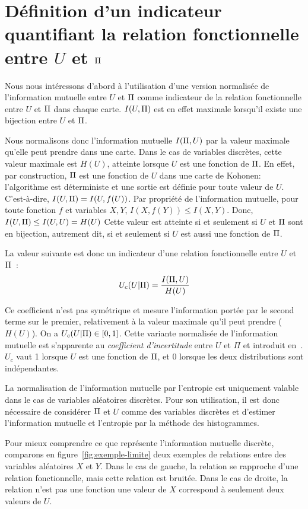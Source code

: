 \documentclass[../main]{subfiles}
\begin{document}
\section{Définition d'un indicateur quantifiant la relation fonctionnelle entre $U$ et $\Pi$}

Nous nous intéressons d'abord à l'utilisation d'une version normalisée de l'information mutuelle entre $U$ et $\Pi$ comme indicateur de la relation fonctionnelle entre $U$ et $\Pi$ dans chaque carte.
$I(U,\Pi)$ est en effet maximale lorsqu'il existe une bijection entre $U$ et $\Pi$.

Nous normalisons donc l'information mutuelle $I(\Pi,U)$  par la valeur maximale qu'elle peut prendre dans une carte. 
Dans le cas de variables discrètes, cette valeur maximale est $H(U)$, atteinte lorsque $U$ est une fonction de $\Pi$.
En effet, par construction, $\Pi$ est une fonction de $U$ dans une carte de Kohonen: l'algorithme est déterministe et une sortie est définie pour toute valeur de $U$. C'est-à-dire, $I(U,\Pi) = I (U, f(U))$.
Par propriété de l'information mutuelle, pour toute fonction $f$ et variables $X,Y$, $I(X,f(Y)) \leq I(X,Y) $. 
Donc, $I(U,\Pi) \leq I(U,U) = H(U)$
Cette valeur est atteinte si et seulement si $U$ et $\Pi$ sont en bijection, autrement dit, si et seulement si $U$ est aussi une fonction de $\Pi$.

La valeur suivante est donc un indicateur d'une relation fonctionnelle entre $U$ et $\Pi$~:
\begin{equation}
U_c(U|\Pi) = \frac{I(\Pi,U)}{H(U)}
\end{equation}

Ce coefficient n'est pas symétrique et mesure l'information portée par le second terme sur le premier, relativement à la valeur maximale qu'il peut prendre ($H(U)$). 
On a $U_c(U|\Pi) \in [0,1]$. 
Cette variante normalisée de l'information mutuelle est s'apparente au \emph{coefficient d'incertitude} entre $U$ et $\Pi$ et introduit en~\cite{Theil1961EconomicFA}.
$U_c$ vaut 1 lorsque $U$ est une fonction de $\Pi$, et $0$ lorsque les deux distributions sont indépendantes.

La normalisation de l'information mutuelle par l'entropie est uniquement valable dans le cas de variables aléatoires discrètes. Pour son utilisation, il est donc nécessaire de considérer $\Pi$ et $U$ comme des variables discrètes et d'estimer l'information mutuelle et l'entropie par la méthode des histogrammes.

Pour mieux comprendre ce que représente l'information mutuelle discrète, comparons en figure~\ref{fig:exemple-limite} deux exemples de relations entre des variables aléatoires $X$ et $Y$.
Dans le cas de gauche, la relation se rapproche d'une relation fonctionnelle, mais cette relation est bruitée. Dans le cas de droite, la relation n'est pas une fonction une valeur de $X$ correspond à seulement deux valeurs de $U$.
\end{document}
